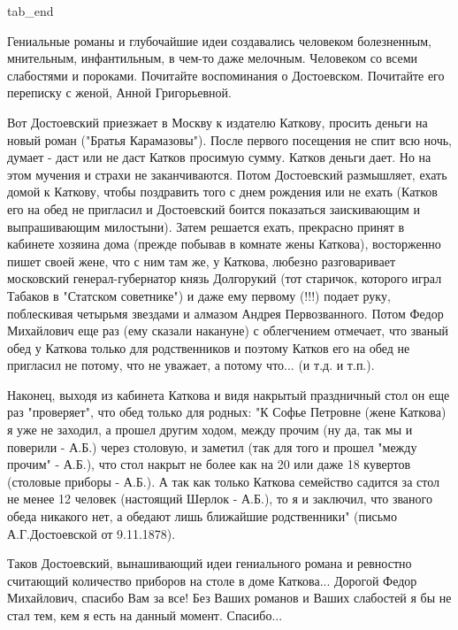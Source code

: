   tab_end
\fi

Гениальные романы и глубочайшие идеи создавались человеком болезненным,
мнительным, инфантильным, в чем-то даже мелочным. Человеком со всеми слабостями
и пороками. Почитайте воспоминания о Достоевском. Почитайте его переписку с
женой, Анной Григорьевной. 

Вот Достоевский приезжает в Москву к издателю Каткову, просить деньги на новый
роман ("Братья Карамазовы"). После первого посещения не спит всю ночь, думает -
даст или не даст Катков просимую сумму. Катков деньги дает. Но на этом мучения
и страхи не заканчиваются. Потом Достоевский размышляет, ехать домой к Каткову,
чтобы поздравить того с днем рождения или не ехать (Катков его на обед не
пригласил и Достоевский боится показаться заискивающим и выпрашивающим
милостыни). Затем решается ехать, прекрасно принят в кабинете хозяина дома
(прежде побывав в комнате жены Каткова), восторженно пишет своей жене, что с
ним там же, у Каткова, любезно разговаривает московский генерал-губернатор
князь Долгорукий (тот старичок, которого играл Табаков в "Статском советнике")
и даже ему первому (!!!) подает руку, поблескивая четырьмя звездами и алмазом
Андрея Первозванного. Потом Федор Михайлович еще раз (ему сказали накануне) с
облегчением отмечает, что званый обед у Каткова только для родственников и
поэтому Катков его на обед не пригласил не потому, что не уважает, а потому
что... (и т.д. и т.п.). 

Наконец, выходя из кабинета Каткова и видя накрытый праздничный стол он еще раз
"проверяет", что обед только для родных: "К Софье Петровне (жене Каткова) я уже
не заходил, а прошел другим ходом, между прочим (ну да, так мы и поверили -
А.Б.) через столовую, и заметил (так для того и прошел "между прочим" - А.Б.),
что стол накрыт не более как на 20 или даже 18 кувертов (столовые приборы -
А.Б.). А так как только Каткова семейство садится за стол не менее 12 человек
(настоящий Шерлок - А.Б.), то я и заключил, что званого обеда никакого нет, а
обедают лишь ближайшие родственники" (письмо А.Г.Достоевской от 9.11.1878). 

Таков Достоевский, вынашивающий идеи гениального романа и ревностно считающий
количество приборов на столе в доме Каткова... Дорогой Федор Михайлович,
спасибо Вам за все! Без Ваших романов и Ваших слабостей я бы не стал тем, кем я
есть на данный момент. Спасибо...
